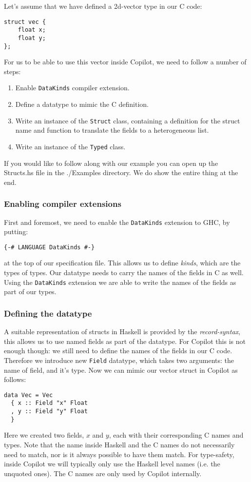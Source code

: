 Let's assume that we have defined a 2d-vector type in our C code:
\begin{lstlisting}
struct vec {
	float x;
	float y;
};
\end{lstlisting}
For us to be able to use this vector inside Copilot, we need to follow a number
of steps:
\begin{enumerate}
  \item Enable \texttt{DataKinds} compiler extension.
  \item Define a datatype to mimic the C definition.
  \item Write an instance of the \texttt{Struct} class, containing a definition
  for the struct name and function to translate the fields to a heterogeneous
    list.
  \item Write an instance of the \texttt{Typed} class.
\end{enumerate}

If you would like to follow along with our example you can open up the Structs.hs file
in the ./Examples directory. We do show the entire thing at the end. 

\subsubsection*{Enabling compiler extensions}
First and foremost, we need to enable the \texttt{DataKinds} extension to GHC,
by putting:
\begin{lstlisting}[language=Copilot]
{-# LANGUAGE DataKinds #-}
\end{lstlisting}
at the top of our specification file. This allows us to define \emph{kinds},
which are the types of types. Our datatype needs to carry the names of the
fields in C as well. Using the \texttt{DataKinds} extension we are able to
write the names of the fields as part of our types.


\subsubsection*{Defining the datatype}
A suitable representation of structs in Haskell is provided by the
\emph{record-syntax}, this allows us to use named fields as part of the
datatype. For Copilot this is not enough though: we still need to define the
names of the fields in our C code. Therefore we introduce new \texttt{Field}
datatype, which takes two arguments: the name of field, and it's type. Now we
can mimic our vector struct in Copilot as follows:
\begin{lstlisting}[language=Copilot]
data Vec = Vec
  { x :: Field "x" Float
  , y :: Field "y" Float
  }
\end{lstlisting}
Here we created two fields, $x$ and $y$, each with their corresponding C names
and types. Note that the name inside Haskell and the C names do not necessarily
need to match, nor is it always possible to have them match. For type-safety,
inside Copilot we will typically only use the Haskell level names (i.e. the
unquoted ones). The C names are only used by Copilot internally.


